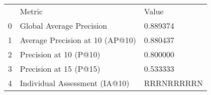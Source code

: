\begin{tabular}{lll}
 & Metric & Value \\
0 & Global Average Precision & 0.889374 \\
1 & Average Precision at 10 (AP@10) & 0.880437 \\
2 & Precision at 10 (P@10) & 0.800000 \\
3 & Precision at 15 (P@15) & 0.533333 \\
4 & Individual Assessment (IA@10) & RRRNRRRRRN \\
\end{tabular}
